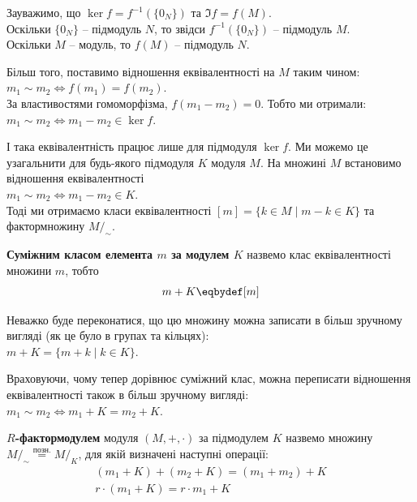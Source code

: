 \documentclass{math_library}
\begin{document}
\begin{remark}
Зауважимо, що $\ker f = f^{-1}(\{0_N\})$ та $\Im f = f(M)$.\\
Оскільки $\{0_N\}$ -- підмодуль $N$, то звідси $f^{-1}(\{0_N\})$ -- підмодуль $M$.\\
Оскільки $M$ -- модуль, то $f(M)$ -- підмодуль $N$.
\end{remark}

\begin{remark}
Більш того, поставимо відношення еквівалентності на $M$ таким чином:\\
$m_1 \sim m_2 \iff f(m_1) = f(m_2)$.\\
За властивостями гомоморфізма, $f(m_1-m_2) = 0$. Тобто ми отримали:\\
$m_1 \sim m_2 \iff m_1 - m_2 \in \ker f$.
\end{remark}

І така еквівалентність працює лише для підмодуля $\ker f$. Ми можемо це узагальнити для будь-якого підмодуля $K$ модуля $M$. На множині $M$ встановимо відношення еквівалентності\\
$m_1 \sim m_2 \iff m_1 - m_2 \in K$.\\
Тоді ми отримаємо класи еквівалентності $[m] = \{k \in M \mid m-k \in K\}$ та фактормножину $M/_{\sim}$.

\begin{definition}
\textbf{Суміжним класом елемента $m$ за модулем $K$} назвемо клас еквівалентності множини $m$, тобто
\begin{align*}
m+K \eqbydef [m]
\end{align*}
\end{definition}

\begin{remark}
Неважко буде переконатися, що цю множину можна записати в більш зручному вигляді (як це було в групах та кільцях):\\
$m + K = \{m + k \mid k \in K\}$.
\end{remark}

Враховуючи, чому тепер дорівнює суміжний клас, можна переписати відношення еквівалентності також в більш зручному вигляді:\\
$m_1 \sim m_2 \iff m_1 + K = m_2 + K$.

\begin{definition}
\textbf{$R$-фактормодулем} модуля $(M,+,\cdot)$ за підмодулем $K$ назвемо множину $M/_\sim \overset{\text{позн.}}{=} M/_K$, для якій визначені наступні операції:
\begin{align*}
(m_1 + K) + (m_2 + K) = (m_1 + m_2) + K \\
r \cdot (m_1 + K) = r \cdot m_1 + K
\end{align*}
\end{definition}
\end{document}
